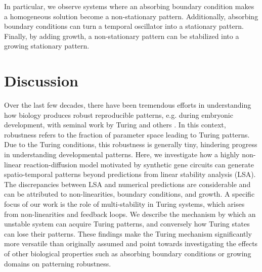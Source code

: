 \documentclass[10pt,letterpaper]{article}
\begin{document}
In particular, we observe systems where an absorbing boundary condition makes a homogeneous solution become a non-stationary pattern.
Additionally, absorbing boundary conditions can turn a temporal oscillator into a stationary pattern.
Finally, by adding growth, a non-stationary pattern can be stabilized into a growing stationary pattern.

\section*{Discussion}

Over the last few decades, there have been tremendous efforts in understanding how biology produces robust reproducible patterns, e.g. during embryonic development, with seminal work by Turing and others \cite{Turing1952,Gierer1972, maini2012turing}. In this context, robustness refers to the fraction of parameter space leading to Turing patterns. Due to the Turing conditions, this robustness is generally tiny, hindering progress in understanding developmental patterns. Here, we investigate how a highly non-linear reaction-diffusion model motivated by synthetic gene circuits can generate spatio-temporal patterns beyond predictions from linear stability analysis (LSA). The discrepancies between LSA and numerical predictions are considerable and can be attributed to non-linearities, boundary conditions, and growth. A specific focus of our work is the role of multi-stability in Turing systems, which arises from non-linearities and feedback loops. We describe the mechanism by which an unstable system can acquire Turing patterns, and conversely how Turing states can lose their patterns. These findings make the Turing mechanism significantly more versatile than originally assumed and point towards investigating the effects of other biological properties such as absorbing boundary conditions or growing domains on patterning robustness. 
\end{document}
